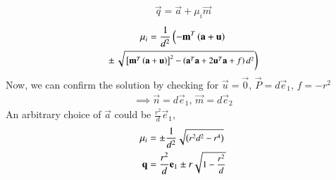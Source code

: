 \documentclass[journal,12pt,twocolumn]{IEEEtran}
\begin{document}
\begin{align}
  \vec{q} = \vec{a} + \mu_i \vec{m}
\end{align}
\begin{multline}
  \mu_i = \frac{1}
  {
  d^2
  }
  \left(-\mathbf{m}^T\left(\mathbf{a}+\mathbf{u}\right)\right.
  \\
  \pm
  {\small
  \ensuremath{\left.\sqrt{
  {}\left[
  \mathbf{m}^T\left(\mathbf{a}+\mathbf{u}\right)
  \right]^2
  -
  \left(
  \mathbf{a}^T\mathbf{a} + 2\mathbf{u}^T\mathbf{a} +f
  \right)
  d^2
  }
  \right)}
  }
\label{eq:sol}
\end{multline}
Now, we can confirm the solution by checking for $\vec{u}=\vec{0},\, \vec{P}=d\vec{e}_1,\, f=-r^2$
\begin{align}
  \implies \vec{n}=d\vec{e}_1,\, \vec{m}=d\vec{e}_2
\end{align}
An arbitrary choice of $\vec{a}$ could be $\frac{r^2}{d}\vec{e}_1$,
\begin{align}
  \mu_i &= \pm\frac{1}
  {
  d^2
  }
  {\small
  \sqrt{
  \left(r^2d^2-r^4\right)
  }
  }\\
  \mathbf{q}&=\frac{r^2}{d}\mathbf{e}_1 \pm r \small\sqrt{1-\frac{r^2}{d}} \label{eq:pointOfTangency}
\end{align}
\end{document}
